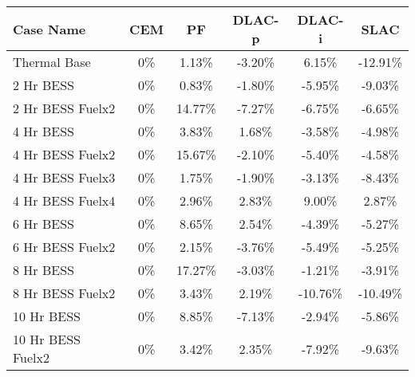 \begin{tabular}{lccccc}
\toprule
Case Name & CEM & PF & DLAC-p & DLAC-i & SLAC \\
\midrule
Thermal Base & 0\% & 1.13\% & -3.20\% & 6.15\% & -12.91\% \\
2 Hr BESS & 0\% & 0.83\% & -1.80\% & -5.95\% & -9.03\% \\
2 Hr BESS Fuelx2 & 0\% & 14.77\% & -7.27\% & -6.75\% & -6.65\% \\
4 Hr BESS & 0\% & 3.83\% & 1.68\% & -3.58\% & -4.98\% \\
4 Hr BESS Fuelx2 & 0\% & 15.67\% & -2.10\% & -5.40\% & -4.58\% \\
4 Hr BESS Fuelx3 & 0\% & 1.75\% & -1.90\% & -3.13\% & -8.43\% \\
4 Hr BESS Fuelx4 & 0\% & 2.96\% & 2.83\% & 9.00\% & 2.87\% \\
6 Hr BESS & 0\% & 8.65\% & 2.54\% & -4.39\% & -5.27\% \\
6 Hr BESS Fuelx2 & 0\% & 2.15\% & -3.76\% & -5.49\% & -5.25\% \\
8 Hr BESS & 0\% & 17.27\% & -3.03\% & -1.21\% & -3.91\% \\
8 Hr BESS Fuelx2 & 0\% & 3.43\% & 2.19\% & -10.76\% & -10.49\% \\
10 Hr BESS & 0\% & 8.85\% & -7.13\% & -2.94\% & -5.86\% \\
10 Hr BESS Fuelx2 & 0\% & 3.42\% & 2.35\% & -7.92\% & -9.63\% \\
\bottomrule
\end{tabular}
